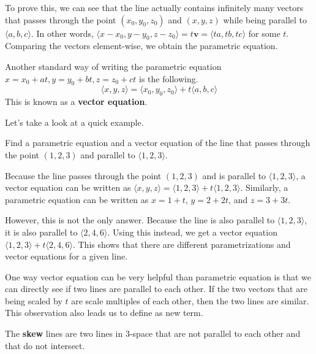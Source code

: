 \documentclass[../../../main.tex]{subfiles}
\begin{document}
To prove this, we can see that the line actually contains infinitely
many vectors that passes through the point $(x_0, y_0, z_0)$ and
$(x, y, z)$ while being parallel to $\langle a, b, c \rangle$.
In other words, $\langle x - x_0, y - y_0, z - z_0 \rangle =
t\mathbf{v} = \langle ta, tb, tc \rangle$ for some $t$. Comparing
the vectors element-wise, we obtain the parametric equation.

\begin{important}
Another standard way of writing the parametric equation
$x = x_0 + at, y = y_0 + bt, z = z_0 + ct$ is the following.
\[
\langle x, y, z \rangle
= \langle x_0, y_0, z_0 \rangle + t \langle a, b, c \rangle
\]
This is known as a \textbf{vector equation}.
\end{important}

Let's take a look at a quick example.

\begin{problem}{}{}
Find a parametric equation and a vector equation of the line
that passes through the point $(1, 2, 3)$ and parallel to
$\langle 1, 2, 3 \rangle$.
\end{problem}
\begin{solution}
Because the line passes through the point $(1, 2, 3)$ and is
parallel to $\langle 1, 2, 3 \rangle$, a vector equation
can be written as $\langle x, y, z \rangle = \langle 1, 2, 3 \rangle
+ t \langle 1, 2, 3 \rangle$. Similarly, a parametric equation
can be written as $x = 1 + t$, $y = 2 + 2t$, and $z = 3 + 3t$.
\end{solution}

However, this is not the only answer. Because the line is
also parallel to $\langle 1, 2, 3 \rangle$, it is also parallel
to $\langle 2, 4, 6 \rangle$. Using this instead, we get a
vector equation $\langle 1, 2, 3 \rangle + t \langle 2, 4, 6 \rangle$.
This shows that there are different parametrizations and vector
equations for a given line.

One way vector equation can be very helpful than parametric equation
is that we can directly see if two lines are parallel to each other.
If the two vectors that are being scaled by $t$ are scale multiples
of each other, then the two lines are similar. This observation
also leads us to define as new term.

\begin{definition}{}{}
The \textbf{skew} lines are two lines in 3-space that are not
parallel to each other and that do not intersect.
\end{definition}
\end{document}
